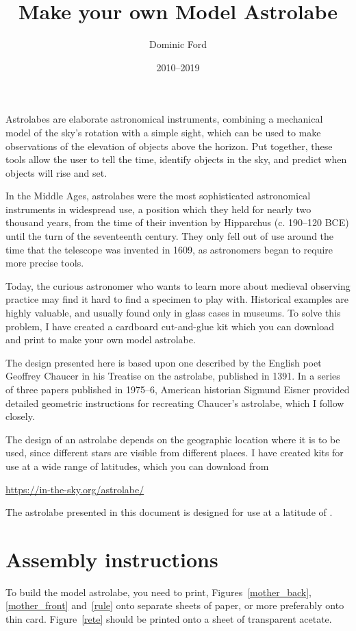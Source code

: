 \documentclass[a4paper,onecolumn,10pt]{article}
\title{Make your own Model Astrolabe}
\author{Dominic Ford}
\date{2010--2019}
\begin{document}
\maketitle
\setcounter{footnote}{1}

Astrolabes are elaborate astronomical instruments, combining a mechanical model
of the sky's rotation with a simple sight, which can be used to make
observations of the elevation of objects above the horizon. Put together, these
tools allow the user to tell the time, identify objects in the sky, and predict
when objects will rise and set.

In the Middle Ages, astrolabes were the most sophisticated astronomical
instruments in widespread use, a position which they held for nearly two
thousand years, from the time of their invention by Hipparchus (c. 190--120
BCE) until the turn of the seventeenth century. They only fell out of use
around the time that the telescope was invented in 1609, as astronomers began
to require more precise tools.

Today, the curious astronomer who wants to learn more about medieval observing
practice may find it hard to find a specimen to play with. Historical examples
are highly valuable, and usually found only in glass cases in museums. To solve
this problem, I have created a cardboard cut-and-glue kit which you can
download and print to make your own model astrolabe.

The design presented here is based upon one described by the English poet
Geoffrey Chaucer in his Treatise on the astrolabe, published in 1391. In a
series of three papers published in 1975--6, American historian Sigmund Eisner
provided detailed geometric instructions for recreating Chaucer's astrolabe,
which I follow closely.

The design of an astrolabe depends on the geographic location where it is to be
used, since different stars are visible from different places. I have created
kits for use at a wide range of latitudes, which you can download from

\url{https://in-the-sky.org/astrolabe/}

The astrolabe presented in this document is designed for use at a latitude of
.

\section*{Assembly instructions}

To build the model astrolabe, you need to print, Figures~\ref{mother_back},
\ref{mother_front} and~\ref{rule} onto separate sheets of paper, or more
preferably onto thin card. Figure~\ref{rete} should be printed onto a sheet of
transparent acetate.
\end{document}
